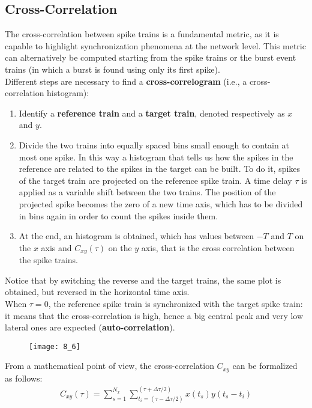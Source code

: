 \subsection{Cross-Correlation}
The cross-correlation between spike trains is a fundamental metric, as it is capable
to highlight synchronization phenomena at the network level. This metric
can alternatively be computed starting from the spike trains or the burst event trains (in which a burst is found using only its first spike).\\
Different steps are necessary to find a \textbf{cross-correlogram} (i.e., a cross-correlation histogram):
\begin{enumerate}
    \item Identify a \textbf{reference train} and a \textbf{target train}, denoted respectively as \(x\) and \(y\).
    \item Divide the two trains into equally spaced bins small enough to contain at most one spike. In this way a histogram that tells us how the spikes in the reference are related to the spikes in the target can be built. To do it, spikes of the target train are projected on the reference spike train.  A time delay \(\tau\) is applied as a variable shift between the two trains. The position of the projected spike becomes the zero of a new time axis, which has to be divided in bins again in order to count the spikes inside them.
    \item At the end, an histogram is obtained, which has values between \(-T\) and \(T\) on the \(x\) axis and \(C_{xy}(\tau)\) on the \(y\) axis, that is the cross correlation between the spike trains. 
\end{enumerate}
Notice that by switching the reverse and the target trains, the same plot is obtained,
but reversed in the horizontal time axis.\\
When \(\tau = 0\), the reference spike train is synchronized with the target spike train: it means that the cross-correlation is high, hence a big central peak and very low lateral ones are expected (\textbf{auto-correlation}).
\begin{figure}[H]
    \texttt{[image: 8\_6]}
    \centering
\end{figure}
From a mathematical point of view, the cross-correlation \(C_{xy}\) can be formalized
as follows:
\begin{align*}
    C_{xy}(\tau)
    =\sum_{s=1}^{N_x}\sum_{t_{i}=(\tau-\Delta{\tau}/2)}^{(\tau+\Delta{\tau}/2)}x(t_s)y(t_s-t_i)
\end{align*}

